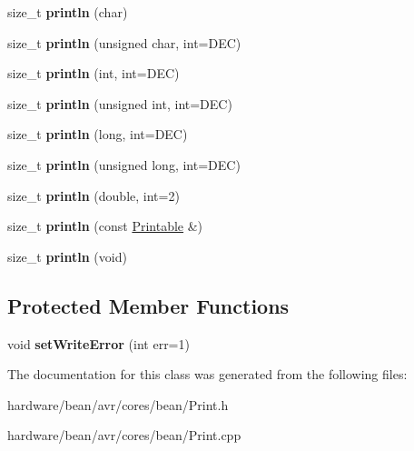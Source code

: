 \begin{DoxyCompactItemize}
\item 
\hypertarget{class_print_a554896a71162f967b5794401239d7a01}{}size\+\_\+t {\bfseries println} (char)\label{class_print_a554896a71162f967b5794401239d7a01}

\item 
\hypertarget{class_print_ac9afe80f50f0118d735295aec7727e50}{}size\+\_\+t {\bfseries println} (unsigned char, int=D\+E\+C)\label{class_print_ac9afe80f50f0118d735295aec7727e50}

\item 
\hypertarget{class_print_a738c88471cfb8eac7c8a804699971413}{}size\+\_\+t {\bfseries println} (int, int=D\+E\+C)\label{class_print_a738c88471cfb8eac7c8a804699971413}

\item 
\hypertarget{class_print_ac87eed1fcb78641169ba2244278c899e}{}size\+\_\+t {\bfseries println} (unsigned int, int=D\+E\+C)\label{class_print_ac87eed1fcb78641169ba2244278c899e}

\item 
\hypertarget{class_print_a833fbec3ceba92e3ec95f51e026e4569}{}size\+\_\+t {\bfseries println} (long, int=D\+E\+C)\label{class_print_a833fbec3ceba92e3ec95f51e026e4569}

\item 
\hypertarget{class_print_aebee3c33ee5d8f10b6f378d5273742d0}{}size\+\_\+t {\bfseries println} (unsigned long, int=D\+E\+C)\label{class_print_aebee3c33ee5d8f10b6f378d5273742d0}

\item 
\hypertarget{class_print_a56e976b079361b6021ef7c2bedb397a2}{}size\+\_\+t {\bfseries println} (double, int=2)\label{class_print_a56e976b079361b6021ef7c2bedb397a2}

\item 
\hypertarget{class_print_a20f9e104153b62e720c9b4c348b44f00}{}size\+\_\+t {\bfseries println} (const \hyperlink{class_printable}{Printable} \&)\label{class_print_a20f9e104153b62e720c9b4c348b44f00}

\item 
\hypertarget{class_print_a169b128f9e22f0c15883768f580541a2}{}size\+\_\+t {\bfseries println} (void)\label{class_print_a169b128f9e22f0c15883768f580541a2}

\end{DoxyCompactItemize}
\subsection*{Protected Member Functions}
\begin{DoxyCompactItemize}
\item 
\hypertarget{class_print_a46656410e23c0ec14d7a01b38b3b6f00}{}void {\bfseries set\+Write\+Error} (int err=1)\label{class_print_a46656410e23c0ec14d7a01b38b3b6f00}

\end{DoxyCompactItemize}


The documentation for this class was generated from the following files\+:\begin{DoxyCompactItemize}
\item 
hardware/bean/avr/cores/bean/Print.\+h\item 
hardware/bean/avr/cores/bean/Print.\+cpp\end{DoxyCompactItemize}
